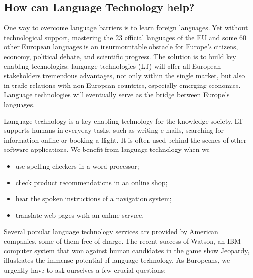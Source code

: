 \documentclass[10pt, plain]{../../metanetpaper}
\begin{document}
\begin{multicols}{2}
\subsection{How can Language Technology help?}
\label{sec:how-can-language-technology-help}

One way to overcome language barriers is to learn foreign languages. Yet without technological support, mastering the 23 official languages of the EU and some 60 other European languages is an insurmountable obstacle for Europe’s citizens, economy, political debate, and scientific progress. The solution is to build key enabling technologies: language technologies (LT) will offer all European stakeholders tremendous advantages, not only within the single market, but also in trade relations with non-European countries, especially emerging economies. Language technologies will eventually serve as the bridge between Europe’s languages.

Language technology is a key enabling technology for the knowledge society. LT supports humans in everyday tasks, such as writing e-mails, searching for information online or booking a flight. It is often used behind the scenes of other software applications. We benefit from language technology when we

\begin{itemize}
\item use spelling checkers in a word processor;
\item check product recommendations in an online shop;
\item hear the spoken instructions of a navigation system;
\item translate web pages with an online service. 
\end{itemize}

Several popular language technology services are provided by American companies, some of them free of charge. The recent success of Watson, an IBM computer system that won against human candidates in the game show Jeopardy, illustrates the immense potential of language technology. As Europeans, we urgently have to ask ourselves a few crucial questions:


\end{multicols}
\end{document}
